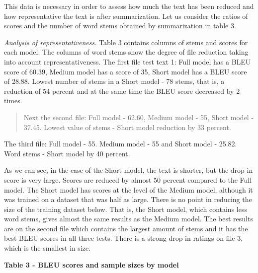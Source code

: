 This data is necessary in order to assess how much the text has been
reduced and how representative the text is after summarization. Let us
consider the ratios of scores and the number of word stems obtained by
summarization in table 3.

\emph{Analysis of representativeness.} Table 3 contains columns of stems
and scores for each model. The columns of word stems show the degree of
file reduction taking into account representativeness. The first file
test text 1: Full model has a BLEU score of 60.39, Medium model has a
score of 35, Short model has a BLEU score of 28.88. Lowest number of
stems in a Short model - 78 stems, that is, a reduction of 54 percent
and at the same time the BLEU score decreased by 2 times.

\begin{quote}
Next the second file: Full model - 62.60, Medium model - 55, Short model
- 37.45. Lowest value of stems - Short model reduction by 33 percent.
\end{quote}

The third file: Full model - 55. Medium model - 55 and Short model -
25.82. Word stems - Short model by 40 percent.

As we can see, in the case of the Short model, the text is shorter, but
the drop in score is very large. Scores are reduced by almost 50 percent
compared to the Full model. The Short model has scores at the level of
the Medium model, although it was trained on a dataset that was half as
large. There is no point in reducing the size of the training dataset
below. That is, the Short model, which contains less word stems, gives
almost the same results as the Medium model. The best results are on the
second file which contains the largest amount of stems and it has the
best BLEU scores in all three tests. There is a strong drop in ratings
on file 3, which is the smallest in size.

\textbf{Table 3 - BLEU scores and sample sizes by model}

